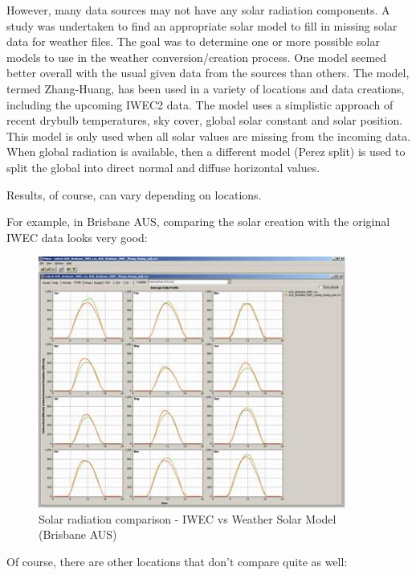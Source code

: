 However, many data sources may not have any solar radiation components. A study was undertaken to find an appropriate solar model to fill in missing solar data for weather files. The goal was to determine one or more possible solar models to use in the weather conversion/creation process. One model seemed better overall with the usual given data from the sources than others. The model, termed Zhang-Huang, has been used in a variety of locations and data creations, including the upcoming IWEC2 data. The model uses a simplistic approach of recent drybulb temperatures, sky cover, global solar constant and solar position. This model is only used when all solar values are missing from the incoming data. When global radiation is available, then a different model (Perez split) is used to split the global into direct normal and diffuse horizontal values.

Results, of course, can vary depending on locations.

For example, in Brisbane AUS, comparing the solar creation with the original IWEC data looks very good:

\begin{figure}[hbtp] %
\centering
\includegraphics[width=0.9\textwidth, height=0.9\textheight, keepaspectratio=true]{media/image006.jpg}
\caption{Solar radiation comparison - IWEC vs Weather Solar Model (Brisbane AUS) \protect \label{fig:solar-radiation-comparison-iwec-vs-weather}}
\end{figure}

Of course, there are other locations that don't compare quite as well:

